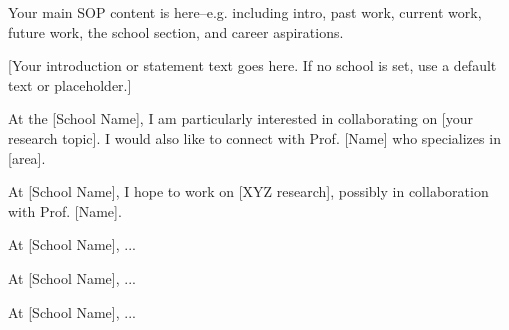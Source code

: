 \documentclass[11pt]{article}
\newcounter{schoolID}
\newcommand{\schoolname}{[School Name]}
\newcommand{\schoolname}{University of California, Berkeley}
\newcommand{\schoolname}{Stanford University}
\newcommand{\schoolname}{Massachusetts Institute of Technology}
\newcommand{\schoolname}{Carnegie Mellon University}
\newcommand{\schoolname}{Georgia Institute of Technology}
\newcommand{\schoolname}{New York University}
\newcommand{\schoolname}{Columbia University}
\newcommand{\schoolname}{Cornell University}
\newcommand{\schoolname}{University of Washington}
\newcommand{\schoolname}{University of Illinois at Urbana-Champaign}
\newcommand{\schoolname}{University of California, San Diego}
\newcommand{\schoolname}{Rice University}
\newcommand{\schoolname}{[School Name]}
\begin{document}
Your main SOP content is here--e.g. including intro, past work, current work, future work, the school section, and career aspirations.





                         

\ifcase\value{schoolID}
  [Your introduction or statement text goes here. If no school is set, use a default text or placeholder.]

\or
  At the {\schoolname}, I am particularly interested in collaborating on [your research topic].
  I would also like to connect with Prof. [Name] who specializes in [area].

\or
  At {\schoolname}, I hope to work on [XYZ research], possibly in collaboration with Prof. [Name].

\or
  At {\schoolname}, ...
  
\or
  At {\schoolname}, ...
  
\or
  At {\schoolname}, ...
\end{document}
